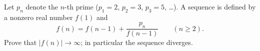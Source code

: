 Let $p_n$ denote the $n$-th prime ($p_1=2$, $p_2=3$, $p_3=5$, \dots). A sequence is defined by a nonzero real number $f(1)$ and
\[f(n)=f(n-1)+\dfrac{p_n}{f(n-1)}\qquad(n\ge2).\]
Prove that $|f(n)|\to\infty$; in particular the sequence diverges.
